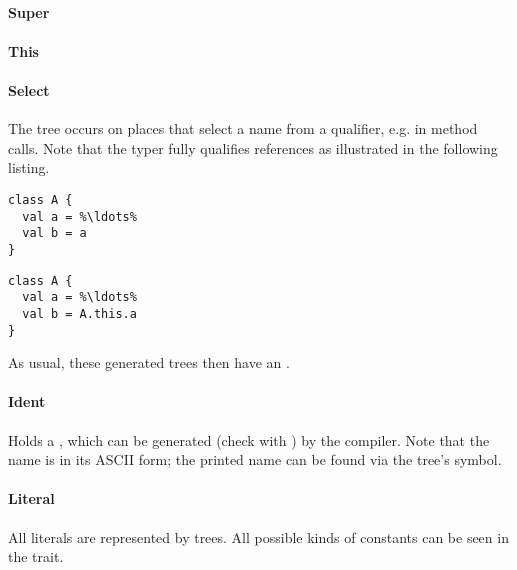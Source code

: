 \paragraph{Super} 

\paragraph{This} 

\paragraph{Select} 

\noindent The  tree occurs on places that select a name from a qualifier, e.g. in method calls. Note that the typer fully qualifies references as illustrated in the following listing.

\begin{multicols}{2}
\begin{lstlisting}
class A {
  val a = %\ldots%
  val b = a
}
\end{lstlisting}
\begin{lstlisting}  
class A {
  val a = %\ldots%
  val b = A.this.a
}
\end{lstlisting}
\end{multicols}

As usual, these generated trees then have an .

\paragraph{Ident} 

\noindent Holds a , which can be generated (check with ) by the compiler. Note that the name is in its ASCII form; the printed name can be found via the tree's symbol.

\paragraph{Literal} 

\noindent All literals are represented by  trees. All possible kinds of constants can be seen in the  trait.

